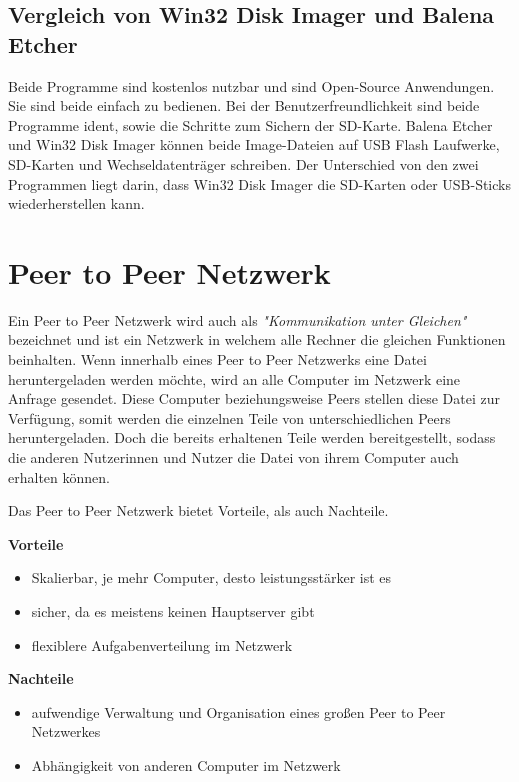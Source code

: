 \subsection{Vergleich von Win32 Disk Imager und Balena Etcher}
Beide Programme sind kostenlos nutzbar und sind Open-Source Anwendungen. Sie sind beide einfach zu bedienen. Bei der Benutzerfreundlichkeit sind beide Programme ident, sowie die Schritte zum Sichern der SD-Karte. Balena Etcher und Win32 Disk Imager können beide Image-Dateien auf USB Flash Laufwerke, SD-Karten und Wechseldatenträger schreiben. Der Unterschied von den zwei Programmen liegt darin, dass Win32 Disk Imager die SD-Karten oder USB-Sticks wiederherstellen kann. \parencite{VergleichvonWin32DiskImagerundBalenaEtcher}

\section{Peer to Peer Netzwerk}
Ein Peer to Peer Netzwerk wird auch als \textit{"Kommunikation unter Gleichen"} bezeichnet und ist ein Netzwerk in welchem alle Rechner die gleichen Funktionen beinhalten. Wenn innerhalb eines Peer to Peer Netzwerks eine Datei heruntergeladen werden möchte, wird an alle Computer im Netzwerk eine Anfrage gesendet. Diese Computer beziehungsweise Peers stellen diese Datei zur Verfügung, somit werden die einzelnen Teile von unterschiedlichen Peers heruntergeladen. Doch die bereits erhaltenen Teile werden bereitgestellt, sodass die anderen Nutzerinnen und Nutzer die Datei von ihrem Computer auch erhalten können. \parencite{PeertoPeerNetzwerk}

Das Peer to Peer Netzwerk bietet Vorteile, als auch Nachteile. 

\textbf{Vorteile}
\begin{itemize}
	\item Skalierbar, je mehr Computer, desto leistungsstärker ist es
	\item sicher, da es meistens keinen Hauptserver gibt
	\item flexiblere Aufgabenverteilung im Netzwerk 
\end{itemize}

\textbf{Nachteile}
\begin{itemize}
	\item aufwendige Verwaltung und Organisation eines großen Peer to Peer Netzwerkes 
	\item Abhängigkeit von anderen Computer im Netzwerk
\end{itemize}

